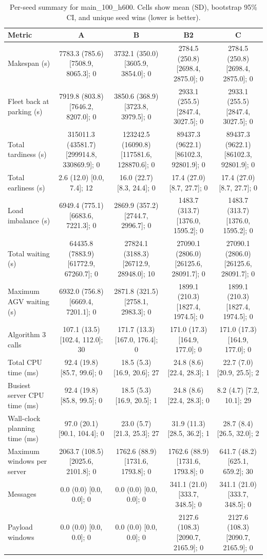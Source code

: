 \begin{table}[t]
\centering
\caption{Per-seed summary for main\_100\_h600. Cells show mean (SD), bootstrap 95\% CI, and unique seed wins (lower is better).}
\label{tab:main-100-h600}
\begin{tabular}{lcccc}
\toprule
Metric & A & B & B2 & C \\
\midrule
Makespan (s) & 7783.3 (785.6) [7508.9, 8065.3]; 0 & 3732.1 (350.0) [3605.9, 3854.0]; 0 & 2784.5 (250.8) [2698.4, 2875.0]; 0 & 2784.5 (250.8) [2698.4, 2875.0]; 0 \\
Fleet back at parking (s) & 7919.8 (803.8) [7646.2, 8207.0]; 0 & 3850.6 (368.9) [3723.8, 3979.5]; 0 & 2933.1 (255.5) [2847.4, 3027.5]; 0 & 2933.1 (255.5) [2847.4, 3027.5]; 0 \\
Total tardiness (s) & 315011.3 (43581.7) [299914.8, 330869.9]; 0 & 123242.5 (16090.8) [117581.6, 128870.6]; 0 & 89437.3 (9622.1) [86102.3, 92801.9]; 0 & 89437.3 (9622.1) [86102.3, 92801.9]; 0 \\
Total earliness (s) & 2.6 (12.0) [0.0, 7.4]; 12 & 16.0 (22.7) [8.3, 24.4]; 0 & 17.4 (27.0) [8.7, 27.7]; 0 & 17.4 (27.0) [8.7, 27.7]; 0 \\
Load imbalance (s) & 6949.4 (775.1) [6683.6, 7221.3]; 0 & 2869.9 (357.2) [2744.7, 2996.7]; 0 & 1483.7 (313.7) [1376.0, 1595.2]; 0 & 1483.7 (313.7) [1376.0, 1595.2]; 0 \\
Total waiting (s) & 64435.8 (7883.9) [61772.9, 67260.7]; 0 & 27824.1 (3188.3) [26712.9, 28948.0]; 10 & 27090.1 (2806.0) [26125.6, 28091.7]; 0 & 27090.1 (2806.0) [26125.6, 28091.7]; 0 \\
Maximum AGV waiting (s) & 6932.0 (756.8) [6669.4, 7201.1]; 0 & 2871.8 (321.5) [2758.1, 2983.3]; 0 & 1899.1 (210.3) [1827.4, 1974.5]; 0 & 1899.1 (210.3) [1827.4, 1974.5]; 0 \\
Algorithm 3 calls & 107.1 (13.5) [102.4, 112.0]; 30 & 171.7 (13.3) [167.0, 176.4]; 0 & 171.0 (17.3) [164.9, 177.0]; 0 & 171.0 (17.3) [164.9, 177.0]; 0 \\
Total CPU time (ms) & 92.4 (19.8) [85.7, 99.6]; 0 & 18.5 (5.3) [16.9, 20.6]; 27 & 24.8 (8.6) [22.4, 28.3]; 1 & 22.7 (7.0) [20.9, 25.5]; 2 \\
Busiest server CPU time (ms) & 92.4 (19.8) [85.8, 99.5]; 0 & 18.5 (5.3) [16.9, 20.5]; 1 & 24.8 (8.6) [22.4, 28.3]; 0 & 8.2 (4.7) [7.2, 10.1]; 29 \\
Wall-clock planning time (ms) & 97.0 (20.1) [90.1, 104.4]; 0 & 23.0 (5.7) [21.3, 25.3]; 27 & 31.9 (11.3) [28.5, 36.2]; 1 & 28.7 (8.4) [26.5, 32.0]; 2 \\
Maximum windows per server & 2063.7 (108.5) [2025.6, 2101.8]; 0 & 1762.6 (88.9) [1731.6, 1793.8]; 0 & 1762.6 (88.9) [1731.6, 1793.8]; 0 & 641.7 (48.2) [625.1, 659.2]; 30 \\
Messages & 0.0 (0.0) [0.0, 0.0]; 0 & 0.0 (0.0) [0.0, 0.0]; 0 & 341.1 (21.0) [333.7, 348.5]; 0 & 341.1 (21.0) [333.7, 348.5]; 0 \\
Payload windows & 0.0 (0.0) [0.0, 0.0]; 0 & 0.0 (0.0) [0.0, 0.0]; 0 & 2127.6 (108.3) [2090.7, 2165.9]; 0 & 2127.6 (108.3) [2090.7, 2165.9]; 0 \\
\bottomrule
\end{tabular}
\end{table}

